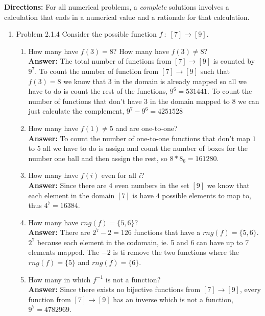 \documentclass{amsart}
\begin{document}
\thispagestyle{fancy}

\textbf{Directions:} For all numerical problems, a \emph{complete} solutions involves a calculation that ends in a numerical value and a rationale for that calculation.\\

\begin{enumerate}
\item Problem 2.1.4 Consider the possible function $f \: : \; [7] \to [9].$\\
\begin{enumerate}
\item How many have $f(3)=8$? How many have $f(3)\not=8$? \\
\textbf{Answer: } The total number of functions from $[7] \to [9]$ is counted by $9^{7}$. To count the number of function from $[7] \to [9]$ such that $f(3)=8$ we know that $3$ in the domain is already mapped so all we have to do is count the rest of the functions, $9^{6} = 531441$. To count the number of functions that don't have $3$ in the domain mapped to $8$ we can just calculate the complement, $9^{7} - 9^{6} = 4251528$\\
\item How many have $f(1)\not=5$ and are one-to-one? \\
\textbf{Answer: } To count the number of one-to-one functions that don't map $1$ to $5$ all we have to do is assign and count the number of boxes for the number one ball and then assign the rest, so $8*8_{6} = 161280$.\\
\item How many have $f(i)$ even for all $i$? \\
\textbf{Answer: } Since there are $4$ even numbers in the set $[9]$ we know that each element in the domain $[7]$ is have $4$ possible elements to map to, thus $4^7 = 16384.$\\
\item How many have $rng(f)=\{5,6\}$?\\
\textbf{Answer: } There are $2^7 - 2 = 126$ functions that have a $rng(f)=\{5,6\}$. $2^7$ because each element in the codomain, ie. 5 and 6 can have up to 7 elements mapped. The  $-2$ is ti remove the two functions where the $rng(f)=\{5\}$ and $rng(f)=\{6\}$.\\
\item How many in which $f^{-1}$ is not a function? \\
\textbf{Answer: } Since there exists no bijective functions from $[7] \to [9]$, every function from $[7] \to [9]$ has an inverse which is not a function, $9^{7} = 4782969$.
\end{enumerate}


\end{enumerate}
\end{document}

